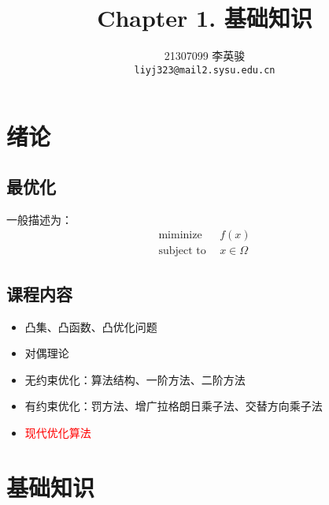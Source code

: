 \documentclass{mytemplate}
\title{Chapter 1. 基础知识}
\author{%
    21307099 李英骏\\
    \texttt{liyj323@mail2.sysu.edu.cn} \\
}
\begin{document}
\maketitle
\section{绪论}
\subsection{最优化}
一般描述为：
\begin{align}
    \text{miminize}  \ \  & f(x)         \\
    \text{subject to}\ \  & x \in \Omega
\end{align}
\subsection{课程内容}
\begin{itemize}
    \item 凸集、凸函数、凸优化问题
    \item 对偶理论
    \item 无约束优化：算法结构、一阶方法、二阶方法
    \item 有约束优化：罚方法、增广拉格朗日乘子法、交替方向乘子法
    \item \textcolor{red}{现代优化算法}
\end{itemize}

\section{基础知识}
\end{document}
